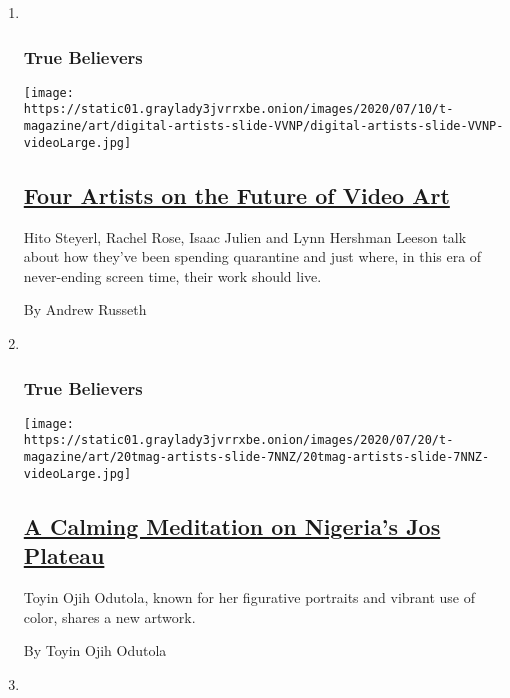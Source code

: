 \begin{enumerate}
\def\labelenumi{\arabic{enumi}.}
\item ~
  \hypertarget{true-believers-9}{%
  \subsubsection{True Believers}\label{true-believers-9}}

  \texttt{[image: https://static01.graylady3jvrrxbe.onion/images/2020/07/10/t-magazine/art/digital-artists-slide-VVNP/digital-artists-slide-VVNP-videoLarge.jpg]}

  \hypertarget{four-artists-on-the-future-of-video-art}{%
  \subsection{\texorpdfstring{\href{/2020/07/22/t-magazine/video-art.html}{Four
  Artists on the Future of Video
  Art}}{Four Artists on the Future of Video Art}}\label{four-artists-on-the-future-of-video-art}}

  Hito Steyerl, Rachel Rose, Isaac Julien and Lynn Hershman Leeson talk
  about how they've been spending quarantine and just where, in this era
  of never-ending screen time, their work should live.

  By Andrew Russeth
\item ~
  \hypertarget{true-believers-10}{%
  \subsubsection{True Believers}\label{true-believers-10}}

  \texttt{[image: https://static01.graylady3jvrrxbe.onion/images/2020/07/20/t-magazine/art/20tmag-artists-slide-7NNZ/20tmag-artists-slide-7NNZ-videoLarge.jpg]}

  \hypertarget{a-calming-meditation-on-nigerias-jos-plateau}{%
  \subsection{\texorpdfstring{\href{/2020/07/22/t-magazine/toyin-ojih-odutola.html}{A
  Calming Meditation on Nigeria's Jos
  Plateau}}{A Calming Meditation on Nigeria's Jos Plateau}}\label{a-calming-meditation-on-nigerias-jos-plateau}}

  Toyin Ojih Odutola, known for her figurative portraits and vibrant use
  of color, shares a new artwork.

  By Toyin Ojih Odutola
\item ~
  \hypertarget{true-believers-11}{%
}
\end{enumerate}
